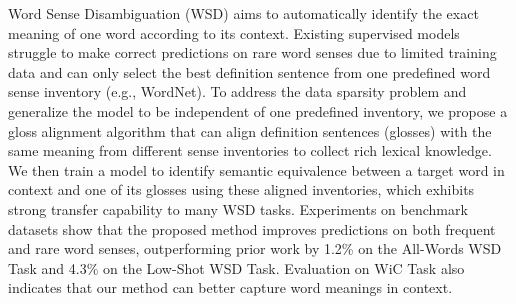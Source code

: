 Word Sense Disambiguation (WSD) aims to automatically identify the exact meaning of one word according to its context. Existing supervised models struggle to make correct predictions on rare word senses due to limited training data and can only select the best definition sentence from one predefined word sense inventory (e.g., WordNet). To address the data sparsity problem and generalize the model to be independent of one predefined inventory, we propose a gloss alignment algorithm that can align definition sentences (glosses) with the same meaning from different sense inventories to collect rich lexical knowledge. We then train a model to identify semantic equivalence between a target word in context and one of its glosses using these aligned inventories, which exhibits strong transfer capability to many WSD tasks. Experiments on benchmark datasets show that the proposed method improves predictions on both frequent and rare word senses, outperforming prior work by 1.2\% on the All-Words WSD Task and 4.3\% on the Low-Shot WSD Task. Evaluation on WiC Task also indicates that our method can better capture word meanings in context.
